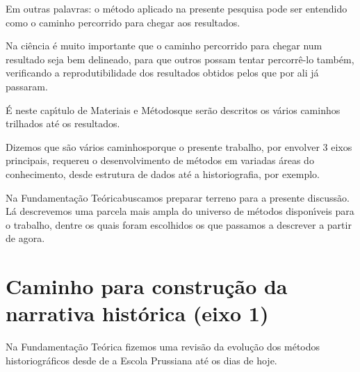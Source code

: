 \documentclass[
12pt,		%
openright,	%
twoside,  %
a4paper,			%
chapter=TITLE,		%
english,			%
french,				%
spanish,			%
brazil				%
]{USPSC-classe/USPSC}
\begin{document}
Em outras palavras: o m\'etodo aplicado na presente pesquisa pode ser entendido como o caminho percorrido para chegar aos resultados.










Na ci\^encia \'e muito importante que o caminho percorrido para chegar num resultado seja bem delineado, para que outros possam tentar percorr\^e-lo tamb\'em, verificando a reprodutibilidade dos resultados obtidos pelos que por ali j\'a passaram.










\'E neste cap\'{\i}tulo de \textquotedbl Materiais e M\'etodos\textquotedbl  que ser\~ao descritos os v\'arios caminhos trilhados at\'e os resultados.










Dizemos que s\~ao \textquotedbl v\'arios caminhos\textquotedbl  porque o presente trabalho, por envolver 3 eixos principais, requereu o desenvolvimento de m\'etodos em variadas \'areas do conhecimento, desde estrutura de dados at\'e a historiografia, por exemplo.










Na \textquotedbl Fundamenta\c{c}\~ao Te\'orica\textquotedbl  buscamos preparar terreno para a presente discuss\~ao. L\'a descrevemos uma parcela mais ampla do universo de m\'etodos dispon\'{\i}veis para o trabalho, dentre os quais foram escolhidos os que passamos a descrever a partir de agora.










\section[Caminho para constru\c{c}\~ao da narrativa hist\'orica (eixo 1)]{Caminho para constru\c{c}\~ao da narrativa hist\'orica (eixo 1)}\label{Caminho para constru\c{c}\~ao da narrativa hist\'orica (eixo 1)}
Na Fundamenta\c{c}\~ao Te\'orica fizemos uma revis\~ao da evolu\c{c}\~ao dos m\'etodos historiogr\'aficos desde de a Escola Prussiana at\'e os dias de hoje.
\end{document}
